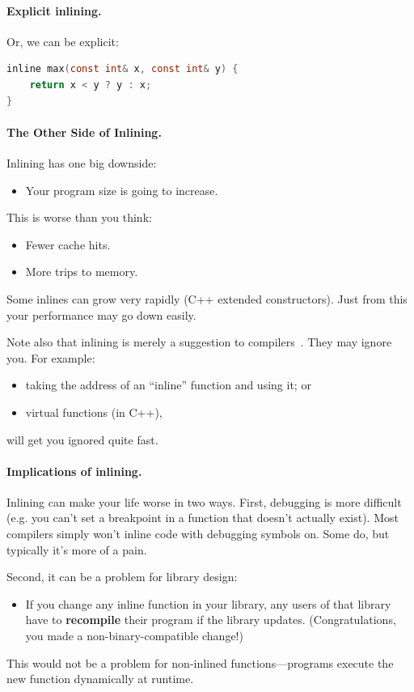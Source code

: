 \documentclass[a4paper]{report}
\begin{document}
\paragraph{Explicit inlining.} Or, we can be explicit:
  \begin{lstlisting}[language=C]
inline max(const int& x, const int& y) {
    return x < y ? y : x;
}
  \end{lstlisting}

\paragraph{The Other Side of Inlining.}
Inlining has one big downside:
  \begin{itemize}
    \item Your program size is going to increase.
  \end{itemize}
   This is worse than you think:
      \begin{itemize}
        \item Fewer cache hits.
        \item More trips to memory.
      \end{itemize}
   Some inlines can grow very rapidly (C++ extended constructors).
  Just from this your performance may go down easily.

  Note also that inlining is merely a suggestion to compilers~\cite{gcc:inlining}.
  They may ignore you.
  For example:
  \begin{itemize}
    \item taking the address of an ``inline'' function and using it; or
    \item virtual functions (in C++),
  \end{itemize}
  will get you ignored quite fast.

\paragraph{Implications of inlining.} Inlining can make your life worse in two ways.
First, debugging is more difficult (e.g. you can't set a breakpoint in a function that
  doesn't actually exist).
 Most compilers simply won't inline code with debugging symbols on.
 Some do, but typically it's more of a pain.

Second, it can be a problem for library design:
  \begin{itemize}
    \item If you change any inline function in your library, any users
      of that library have to {\bf recompile} their program if the
      library updates. (Congratulations, you made a non-binary-compatible change!)
  \end{itemize}
This would not be a problem for non-inlined functions---programs execute the new function
dynamically at runtime.
\end{document}
